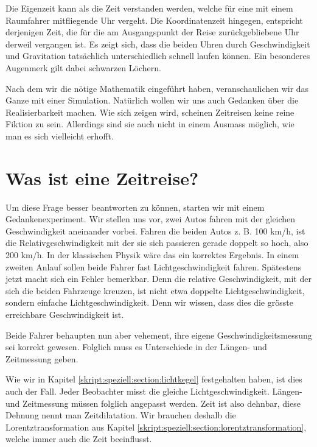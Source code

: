 \begin{refsection}
Die Eigenzeit kann als die Zeit verstanden werden, welche für eine mit einem Raumfahrer mitfliegende Uhr vergeht. Die Koordinatenzeit hingegen, entspricht derjenigen Zeit, die für die am Ausgangspunkt der Reise zurückgebliebene Uhr derweil vergangen ist.
%
%
Es zeigt sich, dass die beiden Uhren durch Geschwindigkeit und Gravitation tatsächlich unterschiedlich schnell laufen können. Ein besonderes Augenmerk gilt dabei schwarzen Löchern. 

Nach dem wir die nötige Mathematik eingeführt haben, veranschaulichen wir das Ganze mit einer Simulation. Natürlich wollen wir uns auch Gedanken über die Realisierbarkeit machen. Wie sich zeigen wird, scheinen Zeitreisen keine reine Fiktion zu sein. Allerdings sind sie auch nicht in einem Ausmass möglich, wie man es sich vielleicht erhofft.

\section{Was ist eine Zeitreise?}
Um diese Frage besser beantworten zu können, starten wir mit einem Gedankenexperiment. Wir stellen uns vor, zwei Autos fahren mit der gleichen Geschwindigkeit aneinander vorbei. Fahren die beiden Autos z. B. 100 km/h, ist die Relativgeschwindigkeit mit der sie sich passieren gerade doppelt so hoch, also 200 km/h. In der klassischen Physik wäre das ein korrektes Ergebnis. In einem zweiten Anlauf sollen beide Fahrer fast Lichtgeschwindigkeit fahren. Spätestens jetzt macht sich ein Fehler bemerkbar. Denn die relative Geschwindigkeit, mit der sich die beiden Fahrzeuge kreuzen, ist nicht etwa doppelte Lichtgeschwindigkeit, sondern einfache Lichtgeschwindigkeit. Denn wir wissen, dass dies die grösste erreichbare Geschwindigkeit ist.

Beide Fahrer behaupten nun aber vehement, ihre eigene Geschwindigkeitsmessung sei korrekt gewesen. Folglich muss es Unterschiede in der Längen- und Zeitmessung geben.

Wie wir in Kapitel \ref{skript:speziell:section:lichtkegel} festgehalten haben, ist dies auch der Fall. Jeder Beobachter misst die gleiche Lichtgeschwindigkeit. Längen- und Zeitmessung müssen folglich angepasst werden. Zeit ist also dehnbar, diese Dehnung nennt man Zeitdilatation. Wir brauchen deshalb die Lorentztransformation aus Kapitel \ref{skript:speziell:section:lorentztransformation}, welche immer auch die Zeit beeinflusst.


\end{refsection}
